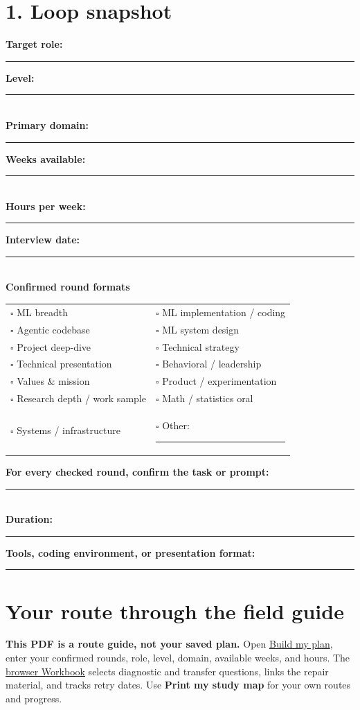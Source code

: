 \documentclass[10pt,letterpaper]{article}
\begin{document}
\section*{1. Loop snapshot}
\textbf{Target role:} \rule{.28\linewidth}{.35pt}\hfill \textbf{Level:} \rule{.16\linewidth}{.35pt}\\[.5em]
\textbf{Primary domain:} \rule{.2\linewidth}{.35pt}\hfill \textbf{Weeks available:} \rule{.12\linewidth}{.35pt}\\[.5em]
\textbf{Hours per week:} \rule{.16\linewidth}{.35pt}\hfill \textbf{Interview date:} \rule{.14\linewidth}{.35pt}\\[.5em]
\vspace{.08in}
\textbf{Confirmed round formats}\par
\begin{tabularx}{\linewidth}{@{}X X@{}}
$\square$ ML breadth & $\square$ ML implementation / coding \\
$\square$ Agentic codebase & $\square$ ML system design \\
$\square$ Project deep-dive & $\square$ Technical strategy \\
$\square$ Technical presentation & $\square$ Behavioral / leadership \\
$\square$ Values \& mission & $\square$ Product / experimentation \\
$\square$ Research depth / work sample & $\square$ Math / statistics oral \\
$\square$ Systems / infrastructure & $\square$ Other: \rule{.35\linewidth}{.35pt}
\end{tabularx}
\vspace{.08in}
\textbf{For every checked round, confirm the task or prompt:} \rule{.35\linewidth}{.35pt}\\[.45em]
\textbf{Duration:} \rule{.16\linewidth}{.35pt}\hfill \textbf{Tools, coding environment, or presentation format:} \rule{.39\linewidth}{.35pt}

\newpage
\section*{Your route through the field guide}
\textbf{This PDF is a route guide, not your saved plan.} Open
\href{https://mlmentorship.com/prep/readiness/}{Build my plan}, enter your confirmed rounds, role, level, domain, available weeks, and hours. The \href{https://mlmentorship.com/prep/}{browser Workbook} selects diagnostic and transfer questions, links the repair material, and tracks retry dates. Use \textbf{Print my study map} for your own routes and progress.
\end{document}
